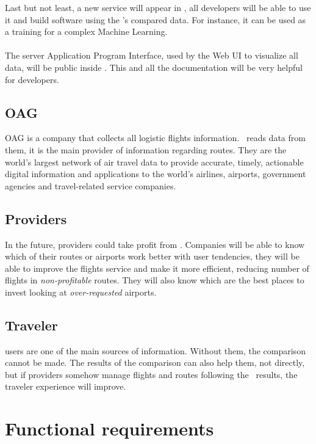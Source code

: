Last but not least, a new service will appear in \company, all developers will be able to use it and build software using the \thesis's compared data. For instance, it can be used as a training for a complex Machine Learning\cite{machine_learning_coursera}.
\\\\
The server Application Program Interface, used by the Web UI to visualize all data, will be public inside \company. This and all the documentation will be very helpful for developers.

\subsection{OAG} \label{sh_oag}

OAG is a company that collects all logistic flights information. \squad\ reads data from them, it is the main provider of information regarding routes. They are the world's largest network of air travel data to provide accurate, timely, actionable digital information and applications to the world's airlines, airports, government agencies and travel-related service companies\cite{oag}.

\subsection{Providers} \label{providers}

In the future, providers could take profit from \thesis. Companies will be able to know which of their routes or airports work better with user tendencies, they will be able to improve the flights service and make it more efficient, reducing number of flights in \textit{non-profitable} routes. They will also know which are the best places to invest looking at \textit{over-requested} airports.

\subsection{Traveler}

\company users are one of the main sources of information. Without them, the comparison cannot be made. The results of the comparison can also help them, not directly, but if providers somehow manage flights and routes following the \thesis\ results, the traveler experience will improve.


\section{Functional requirements}

